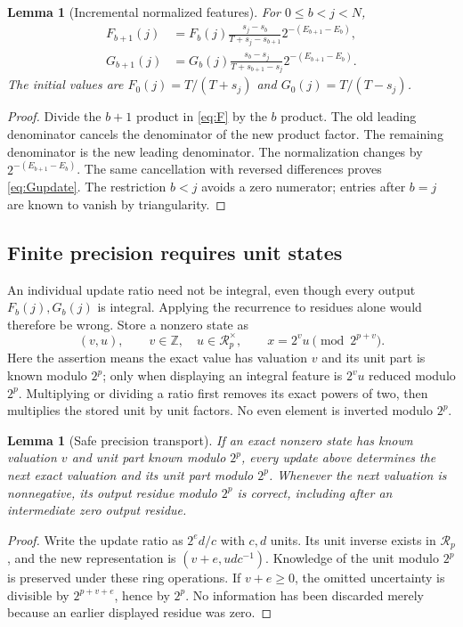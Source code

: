 \documentclass[11pt,letterpaper]{article}
\newtheorem{lemma}[theorem]{Lemma}
\theoremstyle{definition}\newtheorem{definition}[theorem]{Definition}
\theoremstyle{remark}\newtheorem{remark}[theorem]{Remark}
\begin{document}
\begin{lemma}[Incremental normalized features]\label{lem:incremental}
For $0\le b<j<N$,
\begin{align}
 F_{b+1}(j)&=F_b(j)\frac{s_j-s_b}{T+s_j-s_{b+1}}
                         2^{-(E_{b+1}-E_b)},\label{eq:Fupdate}\\
 G_{b+1}(j)&=G_b(j)\frac{s_b-s_j}{T+s_{b+1}-s_j}
                         2^{-(E_{b+1}-E_b)}.\label{eq:Gupdate}
\end{align}
The initial values are $F_0(j)=T/(T+s_j)$ and
$G_0(j)=T/(T-s_j)$.
\end{lemma}
\begin{proof}
Divide the $b+1$ product in \eqref{eq:F} by the $b$ product.
The old leading denominator cancels the denominator of the new product
factor. The remaining denominator is the new leading denominator.
The normalization changes by $2^{-(E_{b+1}-E_b)}$.
The same cancellation with reversed differences proves \eqref{eq:Gupdate}.
The restriction $b<j$ avoids a zero numerator; entries after $b=j$
are known to vanish by triangularity.
\end{proof}

\subsection{Finite precision requires unit states}

An individual update ratio need not be integral, even though every output
$F_b(j),G_b(j)$ is integral. Applying the recurrence to residues alone
would therefore be wrong. Store a nonzero state as
\[
 (v,u),\qquad v\in\mathbb Z,\quad u\in\mathcal R_p^\times,
 \qquad x=2^v u\pmod{2^{p+v}}.
\]
Here the assertion means the exact value has valuation $v$ and its unit
part is known modulo $2^p$; only when displaying an integral feature is
$2^v u$ reduced modulo $2^p$. Multiplying or dividing a ratio first removes
its exact powers of two, then multiplies the stored unit by unit factors.
No even element is inverted modulo $2^p$.

\begin{lemma}[Safe precision transport]\label{lem:unit}
If an exact nonzero state has known valuation $v$ and unit part known
modulo $2^p$, every update above determines the next exact valuation and
its unit part modulo $2^p$. Whenever the next valuation is nonnegative,
its output residue modulo $2^p$ is correct, including after an intermediate
zero output residue.
\end{lemma}
\begin{proof}
Write the update ratio as $2^e d/c$ with $c,d$ units. Its unit inverse
exists in $\mathcal R_p$, and the new representation is
$(v+e,udc^{-1})$. Knowledge of the unit modulo $2^p$ is preserved under
these ring operations. If $v+e\ge0$, the omitted uncertainty is divisible
by $2^{p+v+e}$, hence by $2^p$. No information has been discarded merely
because an earlier displayed residue was zero.
\end{proof}
\end{document}
